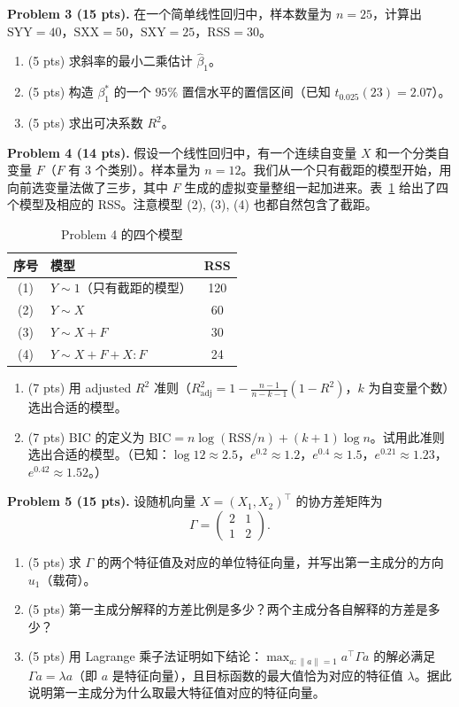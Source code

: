 \documentclass[11pt]{ctexart}
\begin{document}
\noindent\textbf{Problem 3 (15 pts).} 在一个简单线性回归中，样本数量为 $n = 25$，计算出 $\mathrm{SYY} = 40$，$\mathrm{SXX} = 50$，$\mathrm{SXY} = 25$，$\mathrm{RSS} = 30$。
\begin{enumerate}
\item (5 pts) 求斜率的最小二乘估计 $\hat\beta_1$。
\item (5 pts) 构造 $\beta_1^*$ 的一个 $95\%$ 置信水平的置信区间（已知 $t_{0.025}(23) = 2.07$）。
\item (5 pts) 求出可决系数 $R^2$。
\end{enumerate}

\noindent\textbf{Problem 4 (14 pts).} 假设一个线性回归中，有一个连续自变量 $X$ 和一个分类自变量 $F$（$F$ 有 $3$ 个类别）。样本量为 $n = 12$。我们从一个只有截距的模型开始，用向前选变量法做了三步，其中 $F$ 生成的虚拟变量整组一起加进来。表~\ref{tab:mock1p4} 给出了四个模型及相应的 RSS。注意模型 (2), (3), (4) 也都自然包含了截距。

\begin{table}[h]
\centering
\caption{Problem 4 的四个模型}
\label{tab:mock1p4}
\begin{tabular}{clc}
\toprule
序号 & 模型 & RSS \\
\midrule
(1) & $Y \sim 1$（只有截距的模型） & 120 \\
(2) & $Y \sim X$ & 60 \\
(3) & $Y \sim X + F$ & 30 \\
(4) & $Y \sim X + F + X : F$ & 24 \\
\bottomrule
\end{tabular}
\end{table}

\begin{enumerate}
\item (7 pts) 用 adjusted $R^2$ 准则（$R^2_{\mathrm{adj}} = 1 - \frac{n-1}{n-k-1}(1-R^2)$，$k$ 为自变量个数）选出合适的模型。
\item (7 pts) BIC 的定义为 $\mathrm{BIC} = n\log(\mathrm{RSS}/n) + (k+1)\log n$。试用此准则选出合适的模型。（已知：$\log 12 \approx 2.5$，$e^{0.2} \approx 1.2$，$e^{0.4} \approx 1.5$，$e^{0.21} \approx 1.23$，$e^{0.42} \approx 1.52$。）
\end{enumerate}

\noindent\textbf{Problem 5 (15 pts).} 设随机向量 $X = (X_1, X_2)^{\top}$ 的协方差矩阵为
\[
\Gamma = \begin{pmatrix} 2 & 1 \\ 1 & 2 \end{pmatrix}.
\]
\begin{enumerate}
\item (5 pts) 求 $\Gamma$ 的两个特征值及对应的单位特征向量，并写出第一主成分的方向 $u_1$（载荷）。
\item (5 pts) 第一主成分解释的方差比例是多少？两个主成分各自解释的方差是多少？
\item (5 pts) 用 Lagrange 乘子法证明如下结论：$\max_{a:\|a\|=1} a^{\top}\Gamma a$ 的解必满足 $\Gamma a = \lambda a$（即 $a$ 是特征向量），且目标函数的最大值恰为对应的特征值 $\lambda$。据此说明第一主成分为什么取最大特征值对应的特征向量。
\end{enumerate}
\end{document}

